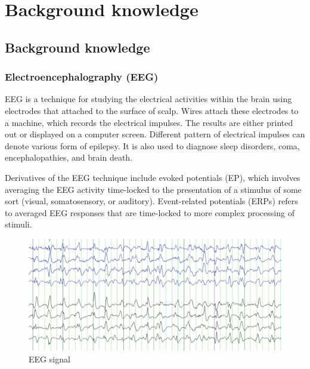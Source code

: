 \chapter{Background knowledge}

\label{ch:Background knowledge}

\setlength{\parindent}{4em}
\setlength{\parskip}{1em}
\renewcommand{\baselinestretch}{1.5}

\section{Background knowledge}

\subsection {Electroencephalography (EEG)}

\hspace{1.5cm} EEG is a technique for studying the electrical activities within the brain using electrodes that attached to the surface of scalp. Wires attach these electrodes to a machine, which records the electrical impulses. The results are either printed out or displayed on a computer screen. Different pattern of electrical impulses can denote various form of epilepsy\cite{ref9}. It is also used to diagnose sleep disorders, coma, encephalopathies, and brain death.\par
Derivatives of the EEG technique include evoked potentials (EP), which involves averaging the EEG activity time-locked to the presentation of a stimulus of some sort (visual, somatosensory, or auditory). Event-related potentials (ERPs) refers to averaged EEG responses that are time-locked to more complex processing of stimuli.

\begin{figure}[h]
	\centering
	\includegraphics[scale = 0.5]{chapter3/31.pdf}
	\caption{EEG signal}
\end{figure}
\newpage

